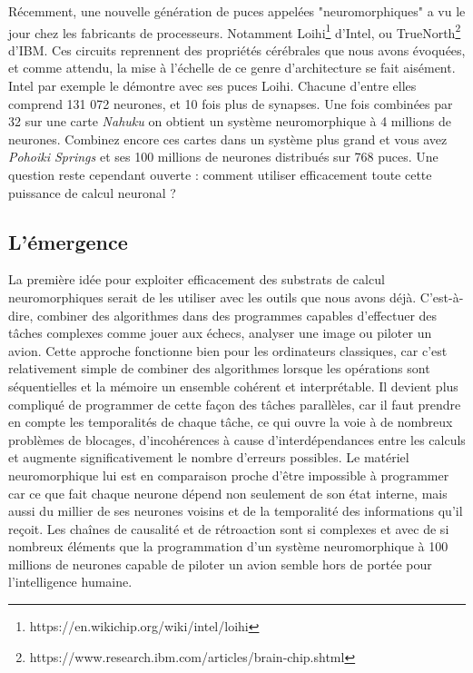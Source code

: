	Récemment, une nouvelle génération de puces appelées "neuromorphiques" a vu le jour chez les fabricants de processeurs. Notamment Loihi\footnote{https://en.wikichip.org/wiki/intel/loihi} d'Intel, ou TrueNorth\footnote{https://www.research.ibm.com/articles/brain-chip.shtml} d'IBM. Ces circuits reprennent des propriétés cérébrales que nous avons évoquées, et comme attendu, la mise à l'échelle de ce genre d'architecture se fait aisément. Intel par exemple le démontre avec ses puces Loihi. Chacune d'entre elles comprend 131 072 neurones, et 10 fois plus de synapses. Une fois combinées par 32 sur une carte \textit{Nahuku} on obtient un système neuromorphique à 4 millions de neurones. Combinez encore ces cartes dans un système plus grand et vous avez \textit{Pohoiki Springs} et ses 100 millions de neurones distribués sur 768 puces. Une question reste cependant ouverte : comment utiliser efficacement toute cette puissance de calcul neuronal ?

\subsection{L'émergence}\label{sec:emergence}

	La première idée pour exploiter efficacement des substrats de calcul neuromorphiques serait de les utiliser avec les outils que nous avons déjà. C'est-à-dire, combiner des algorithmes dans des programmes capables d'effectuer des tâches complexes comme jouer aux échecs, analyser une image ou piloter un avion. Cette approche fonctionne bien pour les ordinateurs classiques, car c'est relativement simple de combiner des algorithmes lorsque les opérations sont séquentielles et la mémoire un ensemble cohérent et interprétable. Il devient plus compliqué de programmer de cette façon des tâches parallèles, car il faut prendre en compte les temporalités de chaque tâche, ce qui ouvre la voie à de nombreux problèmes de blocages, d'incohérences à cause d'interdépendances entre les calculs et augmente significativement le nombre d'erreurs possibles. Le matériel neuromorphique lui est en comparaison proche d'être impossible à programmer car ce que fait chaque neurone dépend non seulement de son état interne, mais aussi du millier de ses neurones voisins et de la temporalité des informations qu'il reçoit. Les chaînes de causalité et de rétroaction sont si complexes et avec de si nombreux éléments que la programmation d'un système neuromorphique à 100 millions de neurones capable de piloter un avion semble hors de portée pour l'intelligence humaine.
	
